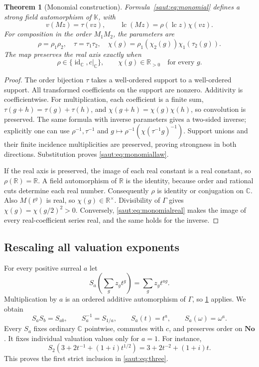 \documentclass[11pt]{article}
\newtheorem{theorem}{Theorem}[section]
\theoremstyle{definition}
\theoremstyle{remark}
\newcommand{\No}{\mathbf{No}}
\newcommand{\R}{\mathbb R}
\newcommand{\C}{\mathbb C}
\newcommand{\K}{\mathbb K}
\newcommand{\id}{\operatorname{id}}
\newcommand{\lc}{\operatorname{lc}}
\numberwithin{equation}{section}
\begin{document}
\begin{theorem}[Monomial construction]\label{saut:thm:monomial}
Formula~\eqref{saut:eq:monomial} defines a strong field automorphism of $\K$, with
\[
 v(Mz)=\tau(vz),\qquad
 \lc(Mz)=\rho(\lc z)\chi(vz).
\]
For composition in the order $M_1M_2$, the parameters are
\begin{equation}\label{saut:eq:monomiallaw}
 \rho=\rho_1\rho_2,\quad \tau=\tau_1\tau_2,\quad
 \chi(g)=\rho_1(\chi_2(g))\chi_1(\tau_2(g)).
\end{equation}
The map preserves the real axis exactly when
\begin{equation}\label{saut:eq:monomialreal}
 \rho\in\{\id_{\C},c|_{\C}\},\qquad
 \chi(g)\in\R_{>0}\quad\text{for every }g.
\end{equation}
\end{theorem}
\begin{proof}
The order bijection $\tau$ takes a well-ordered support to a well-ordered
support. All transformed coefficients on the support are nonzero.
Additivity is coefficientwise. For multiplication, each coefficient is a
finite sum, $\tau(g+h)=\tau(g)+\tau(h)$, and
$\chi(g+h)=\chi(g)\chi(h)$, so convolution is preserved. The same formula
with inverse parameters gives a two-sided inverse; explicitly one can use
$\rho^{-1},\tau^{-1}$ and
$g\mapsto\rho^{-1}(\chi(\tau^{-1}g)^{-1})$. Support unions and their finite
incidence multiplicities are preserved, proving strongness in both
directions. Substitution proves \eqref{saut:eq:monomiallaw}.

If the real axis is preserved, the image of each real constant is a real
constant, so $\rho(\R)=\R$. A field automorphism of $\R$ is the identity,
because order and rational cuts determine each real number. Consequently
$\rho$ is identity or conjugation on $\C$. Also $M(t^g)$ is real, so
$\chi(g)\in\R^\times$. Divisibility of $\Gamma$ gives
$\chi(g)=\chi(g/2)^2>0$. Conversely, \eqref{saut:eq:monomialreal} makes the image
of every real-coefficient series real, and the same holds for the inverse.
\end{proof}

\subsection{Rescaling all valuation exponents}

For every positive surreal $a$ let
\begin{equation}\label{saut:eq:dilation}
 S_a\left(\sum_g z_g t^g\right)=\sum_g z_g t^{ag}.
\end{equation}
Multiplication by $a$ is an ordered additive automorphism of $\Gamma$, so
\cref{saut:thm:monomial} applies. We obtain
\[
 S_aS_b=S_{ab},\qquad S_a^{-1}=S_{1/a},\qquad
 S_a(t)=t^a,\qquad S_a(\omega)=\omega^a.
\]
Every $S_a$ fixes ordinary $\C$ pointwise, commutes with $c$, and preserves
order on $\No$. It fixes individual valuation values only for $a=1$.
For instance,
\[
 S_2\left(3+2t^{-1}+(1+i)t^{1/2}\right)
 =3+2t^{-2}+(1+i)t.
\]
This proves the first strict inclusion in \eqref{saut:eq:three}.
\end{document}
